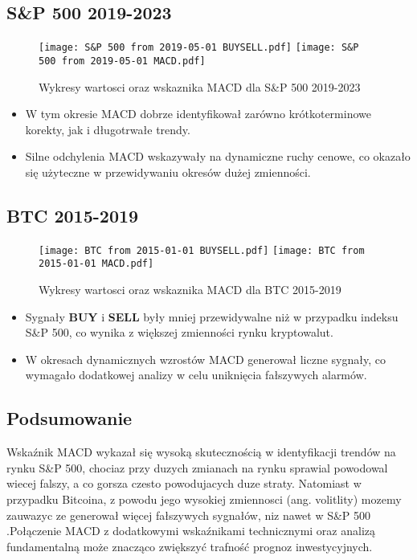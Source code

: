 \documentclass[12pt, letterpaper]{article}
\begin{document}
\subsection{S\&P 500 2019-2023}
\begin{figure}[h!]
    \centering
    \texttt{[image: S\&P 500 from 2019-05-01 BUYSELL.pdf]}
    \texttt{[image: S\&P 500 from 2019-05-01 MACD.pdf]}
    \caption{Wykresy wartosci oraz wskaznika MACD dla S\&P 500 2019-2023} 
    \label{fig:sp500_2019_2023}
\end{figure}

\begin{itemize}
\item W tym okresie MACD dobrze identyfikował zarówno krótkoterminowe korekty, jak i długotrwałe trendy.
\item Silne odchylenia MACD wskazywały na dynamiczne ruchy cenowe, co okazało się użyteczne w przewidywaniu okresów dużej zmienności.
\end{itemize}

\vspace{5cm}  %
\subsection{BTC 2015-2019}

\begin{figure}[h!]
    \centering
    \texttt{[image: BTC from 2015-01-01 BUYSELL.pdf]}
    \texttt{[image: BTC from 2015-01-01 MACD.pdf]}
    \caption{Wykresy wartosci oraz wskaznika MACD dla BTC 2015-2019}
    \label{fig:BTC_2014_2017}
\end{figure}


\begin{itemize}
\item Sygnały \textbf{BUY} i \textbf{SELL} były mniej przewidywalne niż w przypadku indeksu S\&P 500, co wynika z większej zmienności rynku kryptowalut.
\item W okresach dynamicznych wzrostów MACD generował liczne sygnały, co wymagało dodatkowej analizy w celu uniknięcia fałszywych alarmów.
\end{itemize}


\vspace{10cm}  %
\subsection{Podsumowanie}
Wskaźnik MACD wykazał się wysoką skutecznością w identyfikacji trendów na rynku S\&P 500, chociaz przy duzych zmianach na rynku sprawial powodowal wiecej falszy, a co gorsza czesto powodujacych duze straty. Natomiast w przypadku Bitcoina, z powodu jego wysokiej zmiennosci (ang. volitlity) mozemy zauwazyc ze  generował więcej fałszywych sygnałów, niz nawet w S\&P 500 .Połączenie MACD z dodatkowymi wskaźnikami technicznymi oraz analizą fundamentalną może znacząco zwiększyć trafność prognoz inwestycyjnych.
 
\end{document}
